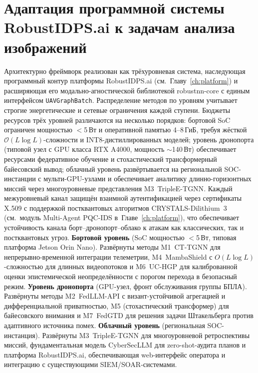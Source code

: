 \section{Адаптация программной системы RobustIDPS.ai к задачам анализа изображений}
\label{sec:uav_arch}
Архитектурно фреймворк реализован как трёхуровневая система, наследующая
программный контур платформы \textsf{RobustIDPS.ai}
(см.~Главу~\ref{ch:platform}) и расширяющая его модально-агностической
библиотекой \textsf{robustnn-core} с единым интерфейсом
\texttt{UAVGraphBatch}. Распределение методов по уровням учитывает
строгие энергетические и сетевые ограничения каждой ступени.
Бюджеты ресурсов трёх уровней различаются на несколько порядков:
бортовой SoC ограничен мощностью $<$5\,Вт и оперативной памятью
4--8\,ГиБ, требуя жёсткой $\mathcal{O}(L\log L)$-сложности и
INT8-дистиллированных моделей; уровень дронопорта (типовой узел с
GPU класса RTX A4000, мощность $\sim$140\,Вт) обеспечивает
ресурсами федеративное обучение и стохастический трансформерный
байесовский вывод; облачный уровень развёртывается на региональной
SOC-инстанции с мульти-GPU-узлами и обеспечивает аналитику
длинно-горизонтных миссий через многоуровневые представления
\textsf{M3~TripleE-TGNN}. Каждый межуровневый канал защищён
взаимной аутентификацией через сертификаты X.509 с поддержкой
постквантовых алгоритмов CRYSTALS-Dilithium~3 (см.\ модуль
Multi-Agent PQC-IDS в~Главе~\ref{ch:platform}), что обеспечивает
устойчивость канала борт--дронопорт--облако к атакам как
классических, так и постквантовых угроз.
\noindent\textbf{Бортовой уровень} (SoC мощностью $<$5\,Вт, типовая
платформа Jetson Orin Nano). Развёрнуты методы \textsf{M1~CT-TGNN}
для непрерывно-временной интеграции телеметрии, \textsf{M4~MambaShield}
с $O(L\log L)$-сложностью для длинных видеопотоков и
\textsf{M6~UC-HGP} для калиброванной оценки эпистемической
неопределённости с порогом перехода в безопасный режим.
\noindent\textbf{Уровень дронопорта} (GPU-узел, фронт обслуживания
группы БПЛА). Развёрнуты методы \textsf{M2~FedLLM-API} с
визант-устойчивой агрегацией и дифференциальной приватностью,
\textsf{M5} (стохастический трансформер) для байесовского внимания и
\textsf{M7~FedGTD} для решения задачи Штакельберга против адаптивного
источника помех.
\noindent\textbf{Облачный уровень} (региональная SOC-инстанция).
Развёрнуты \textsf{M3~TripleE-TGNN} для многоуровневой ретроспективы
миссий, фундаментальная модель \textsf{CyberSecLLM} для zero-shot-аудита
планов и платформа \textsf{RobustIDPS.ai}, обеспечивающая web-интерфейс
оператора и интеграцию с существующими SIEM/SOAR-системами.
